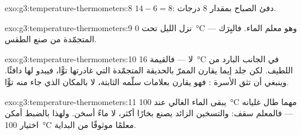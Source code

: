 \begin{solution}{exo:g3:temperature-thermometers:8}
$14 - 6 = 8$: دفئ الصباح بمقدار $8$ درجات.
\end{solution}

\begin{solution}{exo:g3:temperature-thermometers:9}
نزل الليل تحت \qty{0}{\celsius} --- وهو معلم  الماء.
فالبِرَك المتجمّدة  من صنع الطقس.
\end{solution}

\begin{solution}{exo:g3:temperature-thermometers:10}
لا --- فالقيمة \qty{16}{\celsius} في الجانب البارد من اللطيف. لكن جلد
إيما يقارن الممرّ بالحديقة المتجمّدة التي غادرتها توًّا، فيبدو
لها دافئًا. وينبغي أن تثق الأسرة : فهو يقارن
بعلامات سلّمه الثابتة، لا بالمكان الذي جاء منه توًّا.
\end{solution}

\begin{solution}{exo:g3:temperature-thermometers:11}
يبقى الماء الغالي عند \qty{100}{\celsius} مهما طال غليانه ---
فالمعلم سقف: والتسخين الزائد يصنع بخارًا أكثر، لا ماءً أسخن.
ولهذا بالضبط أمكن اختيار \qty{100}{\celsius} معلمًا موثوقًا من
البداية.
\end{solution}
